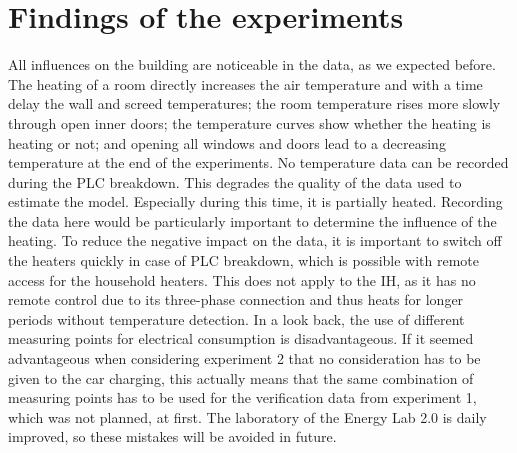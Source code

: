 \section{Findings of the experiments}
\label{sec:findings of the experiments}
All influences on the building are noticeable in the data, as we expected before. The heating of a room directly increases the air temperature and with a time delay the wall and screed temperatures; the room temperature rises more slowly through open inner doors; the temperature curves show whether the heating is heating or not; and opening all windows and doors lead to a decreasing temperature at the end of the experiments. \newline
No temperature data can be recorded during the PLC breakdown. This degrades the quality of the data used to estimate the model. Especially during this time, it is partially heated. Recording the data here would be particularly important to determine the influence of the heating. To reduce the negative impact on the data, it is important to switch off the heaters quickly in case of PLC breakdown, which is possible with remote access for the household heaters. This does not apply to the IH, as it has no remote control due to its three-phase connection and thus heats for longer periods without temperature detection.\newline
In a look back, the use of different measuring points for electrical consumption is disadvantageous. If it seemed advantageous when considering experiment 2 that no consideration has to be given to the car charging, this actually means that the same combination of measuring points has to be used for the verification data from experiment 1, which was not planned, at first.\newline
The laboratory of the Energy Lab 2.0 is daily improved, so these mistakes will be avoided in future.

